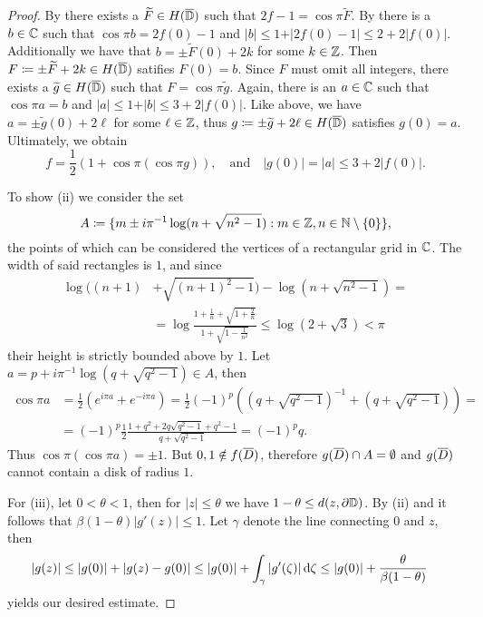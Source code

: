 \begin{proof}
    By  there exists a $\widetilde{F} \in H(\overline{\mathbb{D}})$ such that $2f - 1 = \cos \pi \widetilde{F}$. By  there is a $b \in \mathbb{C}$ such that $\cos \pi b = 2f(0) - 1$ and $\vert b \vert \leq 1 + \vert 2 f(0) - 1 \vert \leq 2 + 2 \vert f(0) \vert$. Additionally we have that $b = \pm \widetilde{F}(0) + 2k$ for some $k \in \mathbb{Z}$. Then $F \coloneqq \pm \widetilde{F} + 2k \in H(\overline{\mathbb{D}})$ satifies $F(0) = b$. Since $F$ must omit all integers, there exists a $\widetilde{g} \in H(\overline{\mathbb{D}})$ such that $F = \cos \pi \widetilde{g}$. Again, there is an $a \in \mathbb{C}$ such that $\cos \pi a = b$ and $\vert a \vert \leq 1 + \vert b \vert \leq 3 + 2 \vert f(0) \vert$. Like above, we have $a = \pm \widetilde{g}(0) + 2\ell$ for some $\ell \in \mathbb{Z}$, thus $g \coloneqq \pm \widetilde{g} + 2\ell \in H(\overline{\mathbb{D}})$ satisfies $g(0) = a$. Ultimately, we obtain
    $$ \textstyle f = \frac{1}{2} (1 + \cos \pi (\cos \pi g)), \quad \textrm{and} \quad \vert g(0) \vert = \vert a \vert \leq 3 + 2 \vert f(0) \vert. $$

    To show (ii) we consider the set
    $$ A \coloneqq \{ m \pm i \pi^{-1} \log (n + \sqrt{n^2 - 1}) : m \in \mathbb{Z}, n \in \mathbb{N} \setminus \{ 0 \} \}, $$
    the points of which can be considered the vertices of a rectangular grid in $\mathbb{C}$. The width of said rectangles is $1$, and since
    \begin{align*}
        \log ((n+1) &+ \sqrt{(n+1)^2 - 1}) - \log (n + \sqrt{n^2 - 1}) = \\
        &= \log \frac{1 + \frac{1}{n} + \sqrt{1 + \frac{2}{n}}}{1 + \sqrt{1 - \frac{1}{n^2}}} \leq \log (2 + \sqrt{3}) < \pi
    \end{align*}
    their height is strictly bounded above by $1$. Let $a = p + i \pi^{-1} \log(q + \sqrt{q^2 - 1}) \in A$, then
    \begin{align*}
        \cos \pi a &= {\textstyle\frac{1}{2}}( e^{i \pi a} + e^{-i \pi a}) = {\textstyle\frac{1}{2}} (-1)^p ((q + \sqrt{q^2 - 1})^{-1} + (q + \sqrt{q^2 - 1})) = \\
        &= (-1)^p \frac{1}{2} \frac{1 + q^2 + 2q \sqrt{q^2 - 1} + q^2 - 1}{q + \sqrt{q^2 - 1}} = (-1)^p q.
    \end{align*}
    Thus $\cos \pi (\cos \pi a) = \pm 1$. But $0, 1 \notin f(\overline{D})$, therefore $g(\overline{D}) \cap A = \emptyset$ and $g(\overline{D})$ cannot contain a disk of radius $1$.

    For (iii), let $0 < \theta < 1$, then for $\vert z \vert \leq \theta$ we have $1 - \theta \leq d(z, \partial \mathbb{D})$. By (ii) and  it follows that $\beta (1 - \theta) \vert g'(z) \vert \leq 1$. Let $\gamma$ denote the line connecting $0$ and $z$, then
    \begin{align*}
        \vert g(z) \vert &\leq \vert g(0) \vert + \vert g(z) - g(0) \vert \leq \vert g(0) \vert + \int_\gamma \vert g'(\zeta) \vert \mathop{}\!\mathrm{d} \zeta \leq \vert g(0) \vert + \frac{\theta}{\beta (1 - \theta)}
    \end{align*}
    yields our desired estimate.
\end{proof}

